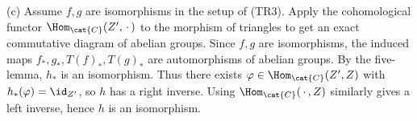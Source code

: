 (c) Assume \(f,g\) are isomorphisms in the setup of (TR3).
Apply the cohomological functor \(\Hom_{\cat{C}}(Z',\,\cdot\,)\) to the morphism of triangles to get an exact commutative diagram of abelian groups.
Since \(f,g\) are isomorphisms, the induced maps \(f_*,g_*,T(f)_*,T(g)_*\) are automorphisms of abelian groups. By the five-lemma, \(h_*\) is an isomorphism.
Thus there exists \(\varphi\in\Hom_{\cat{C}}(Z',Z)\) with \(h_*(\varphi)=\id_{Z'}\), so \(h\) has a right inverse.
Using \(\Hom_{\cat{C}}(\,\cdot\,,Z)\) similarly gives a left inverse, hence \(h\) is an isomorphism.